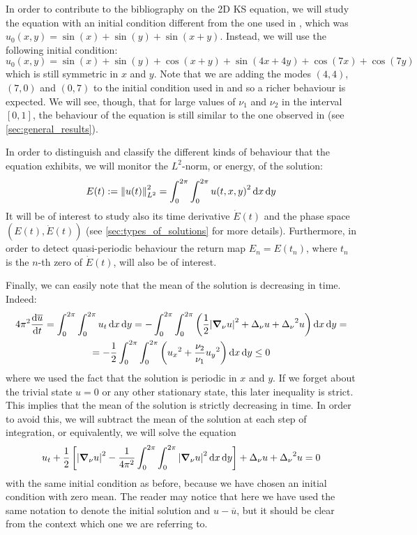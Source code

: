 \documentclass[twoside]{article}
\begin{document}
In order to contribute to the bibliography on the 2D KS equation, we will study the equation with an initial condition different from the one used in \cite{Kalogirou2015}, which was $u_0(x,y) = \sin(x) + \sin(y) + \sin(x+y)$. Instead, we will use the following initial condition:
\begin{equation}\label{eq:initial_condition}
  u_0(x,y) = \sin(x) + \sin(y) + \cos(x+y) + \sin(4x+4y) + \cos(7x) + \cos(7y)
\end{equation}
which is still symmetric in $x$ and $y$. Note that we are adding the modes $(4,4)$, $(7,0)$ and $(0,7)$ to the initial condition used in \cite{Kalogirou2015} and so a richer behaviour is expected. We will see, though, that for large values of $\nu_1$ and $\nu_2$ in the interval $[0,1]$, the behaviour of the equation is still similar to the one observed in \cite{Kalogirou2015} (see \cref{sec:general_results}).

In order to distinguish and classify the different kinds of behaviour that the equation exhibits, we will monitor the $L^2$-norm, or energy, of the solution:
\begin{equation}
  E(t):=\left\|u(t)\right\|_{L^2}^2 = \int_0^{2\pi} \int_0^{2\pi} {u(t,x,y)}^2 \dd{x} \dd{y}
\end{equation}
It will be of interest to study also its time derivative $\dot{E}(t)$ and the phase space $(E(t), \dot{E}(t))$ (see \cref{sec:types_of_solutions} for more details). Furthermore, in order to detect quasi-periodic behaviour the return map $E_n=E(t_n)$, where $t_n$ is the $n$-th zero of $\dot{E}(t)$, will also be of interest.

Finally, we can easily note that the mean of the solution is decreasing in time. Indeed:
\begin{multline}
  4\pi^2\dv{\overline{u}}{t}= \int_0^{2\pi} \int_0^{2\pi} u_t \dd{x} \dd{y} = -\int_0^{2\pi} \int_0^{2\pi} \left( \frac{1}{2} \abs{\grad_\nu u}^2 + \Delta_\nu u + {\Delta_\nu}^2 u \right) \dd{x} \dd{y} =\\= -\frac{1}{2}\int_0^{2\pi} \int_0^{2\pi} \left({u_x}^2 + \frac{\nu_2}{\nu_1} {u_y}^2\right) \dd{x} \dd{y} \leq 0
\end{multline}
where we used the fact that the solution is periodic in $x$ and $y$. If we forget about the trivial state $u=0$ or any other stationary state, this later inequality is strict. This implies that the mean of the solution is strictly decreasing in time. In order to avoid this, we will subtract the mean of the solution at each step of integration, or equivalently, we will solve the equation
\begin{equation}
  u_t + \frac{1}{2} \left[\abs{\grad_\nu u}^2 - \frac{1}{4\pi^2}\int_0^{2\pi} \int_0^{2\pi} \abs{\grad_\nu u}^2 \dd{x} \dd{y} \right] + \Delta_\nu u + {\Delta_\nu}^2 u = 0
\end{equation}
with the same initial condition as before, because we have chosen an initial condition with zero mean. The reader may notice that here we have used the same notation to denote the initial solution and $u-\overline{u}$, but it should be clear from the context which one we are referring to.
\end{document}
